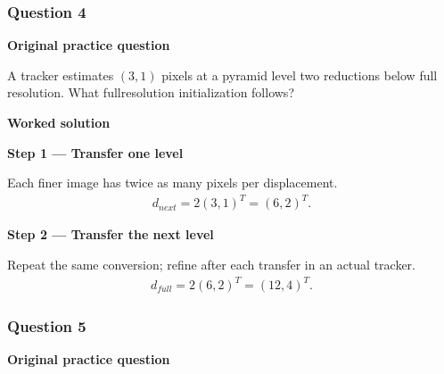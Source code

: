 \documentclass[letterpaper,11pt,english,openany,oneside]{jupyterBook}
\begin{document}
\par\medskip


\subsubsection{Question 4}
\label{\detokenize{lectures/lecture05/tldr:question-4}}
\par\medskip\textbf{Original practice question}\par\smallskip

\sphinxAtStartPar
A tracker estimates \((3,1)\) pixels at a pyramid level two reductions below full resolution. What full\sphinxhyphen{}resolution initialization follows?

\par\medskip

\par\medskip
\textbf{Worked solution}\par\smallskip

\par\medskip{}
{\color{QuizStepRed}\bfseries Step 1 — Transfer one level}\par\smallskip

\sphinxAtStartPar
{} Each finer image has twice as many pixels per displacement.
{\color{QuizMathBlue} \begin{equation*}
\begin{split}d_{next}=2(3,1)^T=(6,2)^T.\end{split}
\end{equation*}}
\par

\par\medskip{}
{\color{QuizStepRed}\bfseries Step 2 — Transfer the next level}\par\smallskip

\sphinxAtStartPar
{} Repeat the same conversion; refine after each transfer in an actual tracker.
{\color{QuizMathBlue} \begin{equation*}
\begin{split}d_{full}=2(6,2)^T=(12,4)^T.\end{split}
\end{equation*}}
\par

\par\medskip


\subsubsection{Question 5}
\label{\detokenize{lectures/lecture05/tldr:question-5}}
\par\medskip\textbf{Original practice question}\par\smallskip
\end{document}
